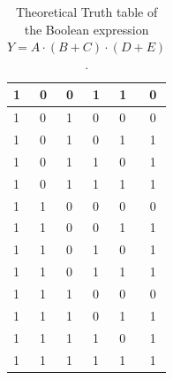 \documentclass[11pt]{article}
\begin{document}
\begin{table}[!h]
\begin{tabular}{|l|l|l|l|l|c|}
        1   & 0   & 0   & 1   & 1   & 0                         \\ \hline
        1   & 0   & 1   & 0   & 0   & 0                         \\ \hline
        1   & 0   & 1   & 0   & 1   & 1                         \\ \hline
        1   & 0   & 1   & 1   & 0   & 1                         \\ \hline
        1   & 0   & 1   & 1   & 1   & 1                         \\ \hline
        1   & 1   & 0   & 0   & 0   & 0                         \\ \hline
        1   & 1   & 0   & 0   & 1   & 1                         \\ \hline
        1   & 1   & 0   & 1   & 0   & 1                         \\ \hline
        1   & 1   & 0   & 1   & 1   & 1                         \\ \hline
        1   & 1   & 1   & 0   & 0   & 0                         \\ \hline
        1   & 1   & 1   & 0   & 1   & 1                         \\ \hline
        1   & 1   & 1   & 1   & 0   & 1                         \\ \hline
        1   & 1   & 1   & 1   & 1   & 1                         \\ \hline
    \end{tabular}
    \caption{Theoretical Truth table of the Boolean expression $Y=A\cdot(B+C)\cdot(D+E)$.}
\end{table}
\newpage
\end{document}
